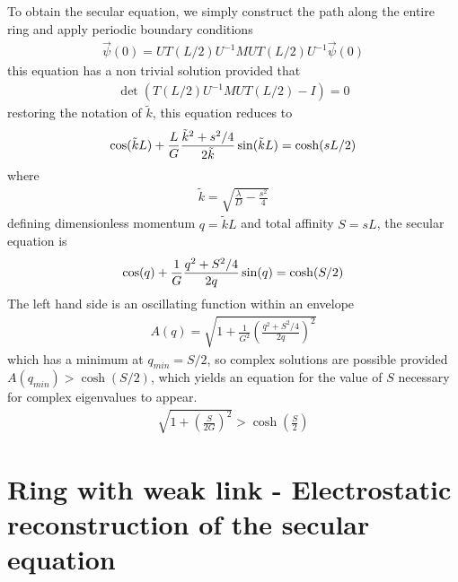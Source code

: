 \documentclass[aps,pre,floats,floatfix,twocolumn]{revtex4}
\newcommand{\be}[1]{\begin{eqnarray}\ifthenelse{#1=-1}{\nonumber}{\ifthenelse{#1=0}{}{\label{e#1}}}}
\newcommand{\beq}{\begin{eqnarray}}
\newcommand{\eeq}{\end{eqnarray}}
\begin{document}
To obtain the secular equation, we simply construct the path along the entire ring and apply periodic boundary conditions
%
\beq
\vec{\psi}(0) = UT(L/2)U^{-1} M  UT(L/2)U^{-1} \vec{\psi}(0)
\eeq
%
this equation has a non trivial solution provided that 
%
\beq
\det \left(T(L/2)U^{-1} M  UT(L/2) - I \right) = 0
\eeq
%
restoring the notation of $\tilde{k}$, this equation reduces to 
%
%
\be{1071}
\cos(\tilde{k}L) + \frac{L}{G } \frac{\tilde{k}^2 + s^2/4}{2\tilde{k}}\sin(\tilde{k}L) = \cosh(sL/2)
\eeq
%
where 
%
\beq
\tilde{k} = \sqrt{\frac{\lambda}{D}-\frac{s^2}{4}}
\eeq
%
defining dimensionless momentum $q=\tilde{k}L$ and total affinity $S=sL$, the secular equation is 
\be{1081}
\cos(q) + \frac{1}{G} \frac{q^2 + S^2/4}{2q}\sin(q) = \cosh(S/2)
\eeq
%
The left hand side is an oscillating function within an envelope
%
\beq
A(q)=\sqrt{1+\frac{1}{G^2}\left( \frac{q^2+S^2/4}{2q}\right)^2}
\eeq
%
which has a minimum at $q_{min}=S/2$, so complex solutions are possible provided $A(q_{min}) > \cosh(S/2)$, which yields an equation
for the value of $S$ necessary for complex eigenvalues to appear. 
%
\beq
\sqrt{1+\left(\frac{S}{2G}\right)^2} > \cosh \left(\frac{S}{2}\right)
\eeq





\section{Ring with weak link - Electrostatic reconstruction of the secular equation}
\end{document}
